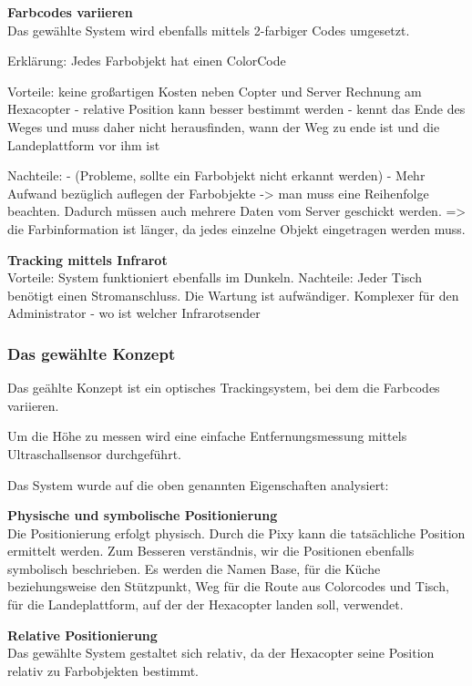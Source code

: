   \textbf{Farbcodes variieren}\\
  Das gewählte System wird ebenfalls mittels 2-farbiger Codes umgesetzt.

  Erklärung: Jedes Farbobjekt hat einen ColorCode

  Vorteile:
  keine großartigen Kosten neben Copter und Server
  Rechnung am Hexacopter
  - relative Position kann besser bestimmt werden
  - kennt das Ende des Weges und muss daher nicht herausfinden, wann der Weg zu ende ist und die Landeplattform vor ihm ist

  Nachteile:
  - (Probleme, sollte ein Farbobjekt nicht erkannt werden)
  - Mehr Aufwand bezüglich auflegen der Farbobjekte -> man muss eine Reihenfolge beachten. Dadurch müssen auch mehrere Daten vom Server geschickt werden. => die Farbinformation ist länger, da jedes einzelne Objekt eingetragen werden muss. 



  \textbf{Tracking mittels Infrarot}\\


  Vorteile:
  System funktioniert ebenfalls im Dunkeln.
  Nachteile: 
  Jeder Tisch benötigt einen Stromanschluss.
  Die Wartung ist aufwändiger.
  Komplexer für den Administrator - wo ist welcher Infrarotsender


  \subsubsection{Das gewählte Konzept}

  Das geählte Konzept ist ein optisches Trackingsystem, bei dem die Farbcodes variieren.

  Um die Höhe zu messen wird eine einfache Entfernungsmessung mittels Ultraschallsensor durchgeführt.

  Das System wurde auf die oben genannten Eigenschaften analysiert:

  \textbf{Physische und symbolische Positionierung}\\
  Die Positionierung erfolgt physisch. Durch die Pixy kann die tatsächliche Position ermittelt werden.
  Zum Besseren verständnis, wir die Positionen ebenfalls symbolisch beschrieben. Es werden die Namen Base, für die Küche beziehungsweise den Stützpunkt, Weg für die Route aus Colorcodes und Tisch, für die Landeplattform, auf der der Hexacopter landen soll, verwendet.

  \textbf{Relative Positionierung}\\
  Das gewählte System gestaltet sich relativ, da der Hexacopter seine Position relativ zu Farbobjekten bestimmt.

